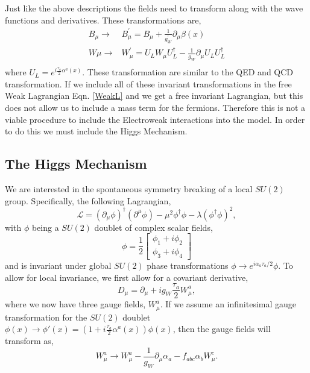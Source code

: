  Just like the above descriptions the fields need to transform along with the wave functions and derivatives. These transformations are,
\begin{equation}
\begin{split}
B_\mu\rightarrow&B^\prime_\mu=B_\mu+\frac{1}{g_W^\prime}\partial_\mu\beta(x) \\
W\mu\rightarrow&W^\prime_\mu=U_L W_\mu U^\dagger_L-\frac{1}{g_W}\partial_\mu U_L U_L^\dagger \\
\end{split}
\end{equation}
where $U_L=e^{i\frac{\tau_a}{2}\alpha^a(x)}$. These transformation are similar to the QED and QCD transformation. If we include all of these invariant transformations in the free Weak Lagrangian Eqn. \ref{WeakL} and we get a free invariant Lagrangian, but this does not allow us to include a mass term for the fermions. Therefore this is not a viable procedure to include the Electroweak interactions into the model. In order to do this we must include the Higgs Mechanism.

\subsection{The Higgs Mechanism}\label{HiggsMechanism}

We are interested in the spontaneous symmetry breaking of a local $SU(2)$ group. Specifically, the following Lagrangian,
\begin{equation}\label{HiggsLagrangian}
\mathcal{L}=(\partial_\mu\phi)^\dagger(\partial^\mu\phi)-\mu^2\phi^\dagger\phi-\lambda(\phi^\dagger\phi)^2,
\end{equation}
with $\phi$ being a $SU(2)$ doublet of complex scalar fields,
\begin{equation}
\phi=\frac{1}{2}
\begin{bmatrix}
\phi_1+i\phi_2 \\
\phi_3+i\phi_4
\end{bmatrix}
\end{equation} 
and is invariant under global $SU(2)$ phase transformations $\phi\rightarrow e^{i\alpha_a\tau_a/2}\phi$. To allow for local invariance, we first allow for a covariant derivative,
\begin{equation}
D_\mu=\partial_\mu+ig_W \frac{\tau_a}{2}W_\mu^a,
\end{equation}
where we now have three gauge fields, $W_\mu^a$. If we assume an infinitesimal gauge transformation for the $SU(2)$ doublet $\phi(x)\rightarrow\phi'(x)=(1 +i\frac{\tau_a}{2}\alpha^a(x))\phi(x)$, then the gauge fields will transform as,
\begin{equation}\label{HiggVectorTransform}
W^a_\mu\rightarrow W^a_\mu-\frac{1}{g_W}\partial_\mu\alpha_a-f_{abc}\alpha_bW^c_\mu.
\end{equation}


